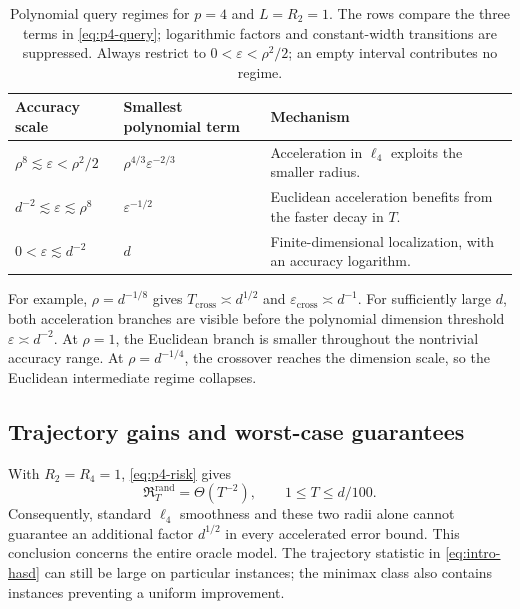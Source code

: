 \documentclass[11pt]{article}
\newcommand{\Risk}{\mathfrak{R}}
\newcommand{\eps}{\varepsilon}
\theoremstyle{definition}
\theoremstyle{remark}
\begin{document}
\begin{table}[htbp]
\centering
\caption{Polynomial query regimes for $p=4$ and $L=R_2=1$.
The rows compare the three terms in \cref{eq:p4-query}; logarithmic
factors and constant-width transitions are suppressed.
Always restrict to $0<\eps<\rho^2/2$; an empty interval contributes
no regime.}
\label{tab:p4}
\small
\renewcommand{\arraystretch}{1.3}
\begin{tabularx}{\textwidth}{@{}p{}p{}Y@{}}
\toprule
Accuracy scale & Smallest polynomial term & Mechanism \\
\midrule
$\rho^8\lesssim\eps<\rho^2/2$
& $\rho^{4/3}\eps^{-2/3}$ & Acceleration in $\ell_4$ exploits the smaller radius. \\
\addlinespace[3pt]
$d^{-2}\lesssim\eps\lesssim\rho^8$
& $\eps^{-1/2}$ & Euclidean acceleration benefits from the faster decay in $T$. \\
\addlinespace[3pt]
$0<\eps\lesssim d^{-2}$
& $d$ & Finite-dimensional localization, with an accuracy logarithm. \\
\bottomrule
\end{tabularx}
\end{table}

For example, $\rho=d^{-1/8}$ gives
$T_{\mathrm{cross}}\asymp d^{1/2}$ and
$\eps_{\mathrm{cross}}\asymp d^{-1}$.
For sufficiently large $d$, both acceleration branches are visible before the polynomial
dimension threshold $\eps\asymp d^{-2}$.
At $\rho=1$, the Euclidean branch is smaller throughout the nontrivial
accuracy range. At $\rho=d^{-1/4}$, the crossover reaches the dimension
scale, so the Euclidean intermediate regime collapses.

\subsection{Trajectory gains and worst-case guarantees}

With $R_2=R_4=1$, \cref{eq:p4-risk} gives
\begin{equation}
\label{eq:no-uniform-gain}
 \Risk_T^{\mathrm{rand}}=\Theta(T^{-2}),\qquad 1\le T\le d/100.
\end{equation}
Consequently, standard $\ell_4$ smoothness and these two radii alone
cannot guarantee an additional factor $d^{1/2}$ in every accelerated
error bound. This conclusion concerns the entire oracle model.
The trajectory statistic in \cref{eq:intro-hasd} can still be large on
particular instances; the minimax class also contains instances
preventing a uniform improvement.
\end{document}
